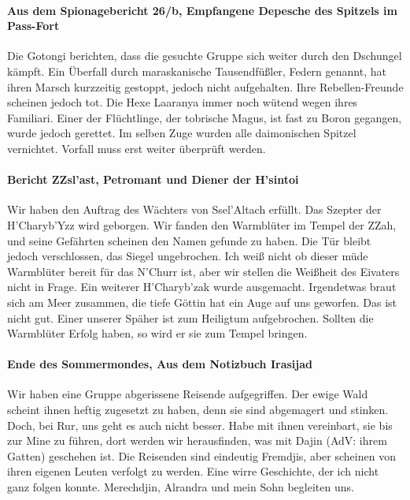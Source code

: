 \paragraph{Aus dem Spionagebericht 26/b, Empfangene Depesche des Spitzels im Pass-Fort}
Die Gotongi berichten, dass die gesuchte Gruppe sich weiter durch den Dschungel kämpft. Ein Überfall durch maraskanische Tausendfüßler, Federn genannt, hat ihren Marsch kurzzeitig gestoppt, jedoch nicht aufgehalten. Ihre Rebellen-Freunde scheinen jedoch tot. Die Hexe Laaranya immer noch wütend wegen ihres Familiari. Einer der Flüchtlinge, der tobrische Magus, ist fast zu Boron gegangen, wurde jedoch gerettet. Im selben Zuge wurden alle daimonischen Spitzel vernichtet. Vorfall muss erst weiter überprüft werden.

\paragraph{Bericht ZZsl'ast, Petromant und Diener der H'sintoi}
Wir haben den Auftrag des Wächters von Ssel'Altach erfüllt. Das Szepter der H'Charyb'Yzz wird geborgen. Wir fanden den Warmblüter im Tempel der ZZah, und seine Gefährten scheinen den Namen gefunde zu haben. Die Tür bleibt jedoch verschlossen, das Siegel ungebrochen.
Ich weiß nicht ob dieser müde Warmblüter bereit für das N'Churr ist, aber wir stellen die Weißheit des Eivaters nicht in Frage. Ein weiterer H'Charyb'zak wurde ausgemacht. Irgendetwas braut sich am Meer zusammen, die tiefe Göttin hat ein Auge auf uns geworfen. Das ist nicht gut.
Einer unserer Späher ist zum Heiligtum aufgebrochen. Sollten die Warmblüter Erfolg haben, so wird er sie zum Tempel bringen.

\paragraph{Ende des Sommermondes, Aus dem Notizbuch Irasijad}
Wir haben eine Gruppe abgerissene Reisende aufgegriffen. Der ewige Wald scheint ihnen heftig zugesetzt zu haben, denn sie sind abgemagert und stinken. Doch, bei Rur, uns geht es auch nicht besser. Habe mit ihnen vereinbart, sie bis zur Mine zu führen, dort werden wir herausfinden, was mit Dajin (AdV: ihrem Gatten) geschehen ist. Die Reisenden sind eindeutig Fremdjis, aber scheinen von ihren eigenen Leuten verfolgt zu werden. Eine wirre Geschichte, der ich nicht ganz folgen konnte. Merechdjin, Alrandra und mein Sohn begleiten uns.

